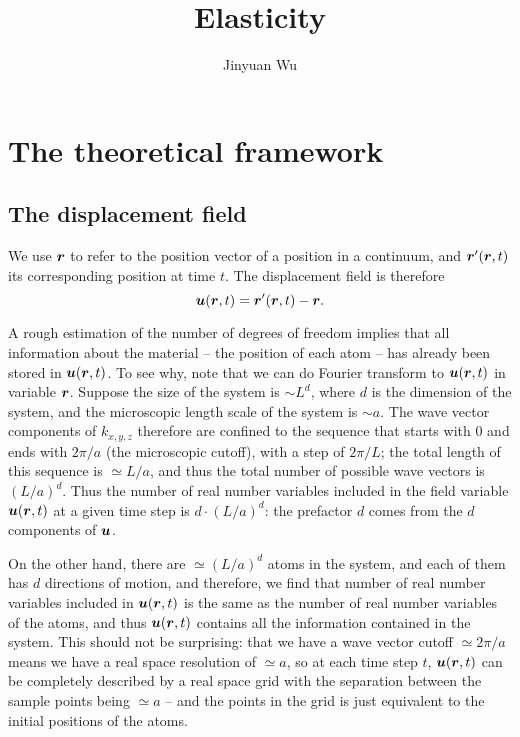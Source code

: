 \documentclass[hyperref, a4paper]{article}
\title{Elasticity}
\author{Jinyuan Wu}
\begin{document}
\maketitle

\section{The theoretical framework}

\subsection{The displacement field}

We use $\vb*{r}$ to refer to the position vector of a position in a continuum,
and $\vb*{r}'(\vb*{r}, t)$ its corresponding position at time $t$.
The displacement field is therefore 
\begin{equation}
    \vb*{u}(\vb*{r}, t) = \vb*{r}'(\vb*{r}, t) - \vb*{r}.
\end{equation}

A rough estimation of the number of degrees of freedom 
implies that all information about the material -- the position of each atom -- 
has already been stored in $\vb*{u}(\vb*{r}, t)$.
To see why, note that we can do Fourier transform to $\vb*{u}(\vb*{r}, t)$ 
in variable $\vb*{r}$.
Suppose the size of the system is $\sim L^d$,
where $d$ is the dimension of the system,
and the microscopic length scale of the system is $\sim a$.
The wave vector components of $k_{x, y, z}$ therefore are
confined to the sequence that starts with $0$ and ends with $2\pi / a$ 
(the microscopic cutoff),
with a step of $2\pi / L$;
the total length of this sequence is $\simeq L / a$,
and thus the total number of possible wave vectors is $(L / a)^d$.
Thus the number of real number variables included in the field variable $\vb*{u}(\vb*{r}, t)$ 
at a given time step 
is $d \cdot (L / a)^d$:
the prefactor $d$ comes from the $d$ components of $\vb*{u}$.

On the other hand, there are $\simeq (L / a)^d$ atoms in the system,
and each of them has $d$ directions of motion,
and therefore, we find that number of real number variables included in $\vb*{u}(\vb*{r}, t)$
is the same as the number of real number variables of the atoms,
and thus $\vb*{u}(\vb*{r}, t)$ contains all the information contained in the system.
This should not be surprising:
that we have a wave vector cutoff $\simeq 2\pi /a$ 
means we have a real space resolution of $\simeq a$,
so at each time step $t$, $\vb*{u}(\vb*{r}, t)$ 
can be completely described by a real space grid with 
the separation between the sample points being $\simeq a$ -- 
and the points in the grid is just equivalent to the initial positions of the atoms.
\end{document}

